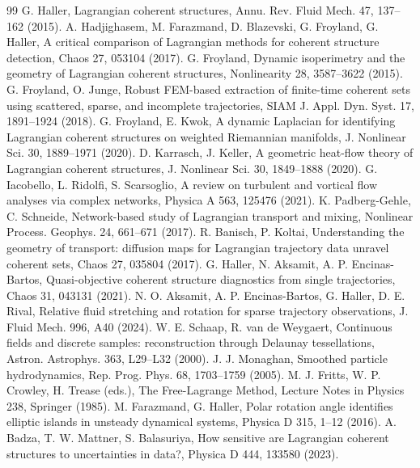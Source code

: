 \documentclass[11pt]{article}
\theoremstyle{definition}\newtheorem{definition}{Definition}\theoremstyle{remark}\newtheorem{remark}{Remark}
\begin{document}
\begin{thebibliography}{99}\small
{} G. Haller, Lagrangian coherent structures, Annu. Rev. Fluid Mech. 47, 137--162 (2015).
 A. Hadjighasem, M. Farazmand, D. Blazevski, G. Froyland, G. Haller, A critical comparison of Lagrangian methods for coherent structure detection, Chaos 27, 053104 (2017).
 G. Froyland, Dynamic isoperimetry and the geometry of Lagrangian coherent structures, Nonlinearity 28, 3587--3622 (2015).
 G. Froyland, O. Junge, Robust FEM-based extraction of finite-time coherent sets using scattered, sparse, and incomplete trajectories, SIAM J. Appl. Dyn. Syst. 17, 1891--1924 (2018).
 G. Froyland, E. Kwok, A dynamic Laplacian for identifying Lagrangian coherent structures on weighted Riemannian manifolds, J. Nonlinear Sci. 30, 1889--1971 (2020).
 D. Karrasch, J. Keller, A geometric heat-flow theory of Lagrangian coherent structures, J. Nonlinear Sci. 30, 1849--1888 (2020).
 G. Iacobello, L. Ridolfi, S. Scarsoglio, A review on turbulent and vortical flow analyses via complex networks, Physica A 563, 125476 (2021).
 K. Padberg-Gehle, C. Schneide, Network-based study of Lagrangian transport and mixing, Nonlinear Process. Geophys. 24, 661--671 (2017).
 R. Banisch, P. Koltai, Understanding the geometry of transport: diffusion maps for Lagrangian trajectory data unravel coherent sets, Chaos 27, 035804 (2017).
 G. Haller, N. Aksamit, A. P. Encinas-Bartos, Quasi-objective coherent structure diagnostics from single trajectories, Chaos 31, 043131 (2021).
 N. O. Aksamit, A. P. Encinas-Bartos, G. Haller, D. E. Rival, Relative fluid stretching and rotation for sparse trajectory observations, J. Fluid Mech. 996, A40 (2024).
 W. E. Schaap, R. van de Weygaert, Continuous fields and discrete samples: reconstruction through Delaunay tessellations, Astron. Astrophys. 363, L29--L32 (2000).
 J. J. Monaghan, Smoothed particle hydrodynamics, Rep. Prog. Phys. 68, 1703--1759 (2005).
 M. J. Fritts, W. P. Crowley, H. Trease (eds.), The Free-Lagrange Method, Lecture Notes in Physics 238, Springer (1985).
 M. Farazmand, G. Haller, Polar rotation angle identifies elliptic islands in unsteady dynamical systems, Physica D 315, 1--12 (2016).
 A. Badza, T. W. Mattner, S. Balasuriya, How sensitive are Lagrangian coherent structures to uncertainties in data?, Physica D 444, 133580 (2023).

\end{thebibliography}
\end{document}
